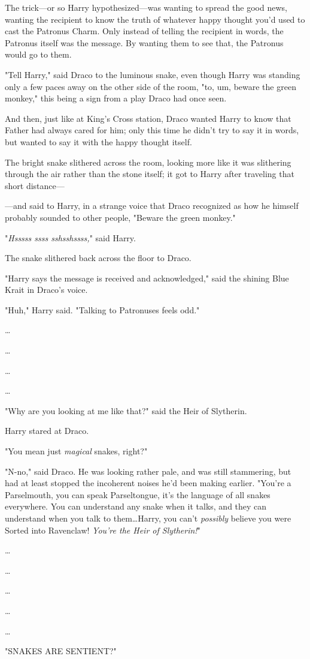 The trick—or so Harry hypothesized—was wanting to spread the good news,
wanting the recipient to know the truth of whatever happy thought you’d used to
cast the Patronus Charm. Only instead of telling the recipient in words, the
Patronus itself was the message. By wanting them to see that, the Patronus
would go to them.

"Tell Harry," said Draco to the luminous snake, even though Harry was standing
only a few paces away on the other side of the room, "to, um, beware the green
monkey," this being a sign from a play Draco had once seen.

And then, just like at King’s Cross station, Draco wanted Harry to know that
Father had always cared for him; only this time he didn’t try to say it in
words, but wanted to say it with the happy thought itself.

The bright snake slithered across the room, looking more like it was slithering
through the air rather than the stone itself; it got to Harry after traveling
that short distance—

—and said to Harry, in a strange voice that Draco recognized as how he
himself probably sounded to other people, "Beware the green monkey."

"\emph{Hsssss ssss sshsshssss,}" said Harry.

The snake slithered back across the floor to Draco.

"Harry says the message is received and acknowledged," said the shining Blue
Krait in Draco’s voice.

"Huh," Harry said. "Talking to Patronuses feels odd."

…

…

…

…

"Why are you looking at me like that?" said the Heir of Slytherin.

Harry stared at Draco.

"You mean just \emph{magical} snakes, right?"

"N-no," said Draco. He was looking rather pale, and was still stammering, but
had at least stopped the incoherent noises he’d been making earlier. "You’re a
Parselmouth, you can speak Parseltongue, it’s the language of all snakes
everywhere. You can understand any snake when it talks, and they can understand
when you talk to them…Harry, you can’t \emph{possibly} believe you were
Sorted into Ravenclaw! \emph{You’re the Heir of Slytherin!}"

…

…

…

…

…

"SNAKES ARE SENTIENT?"
